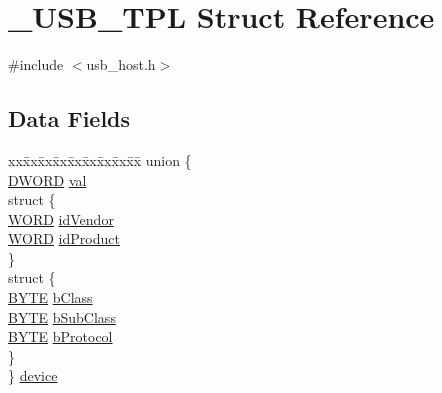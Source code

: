 \hypertarget{struct___u_s_b___t_p_l}{}\section{\+\_\+\+U\+S\+B\+\_\+\+T\+P\+L Struct Reference}
\label{struct___u_s_b___t_p_l}


{\ttfamily \#include $<$usb\+\_\+host.\+h$>$}

\subsection*{Data Fields}
\begin{DoxyCompactItemize}
\item 
\begin{tabbing}
xx\=xx\=xx\=xx\=xx\=xx\=xx\=xx\=xx\=\kill
union \{\\
\>\hyperlink{_generic_type_defs_8h_ad342ac907eb044443153a22f964bf0af}{DWORD} \hyperlink{struct___u_s_b___t_p_l_a5a7eddd9a55e78e10170062484c8c52a}{val}\\
\>struct \{\\
\>\>\hyperlink{_generic_type_defs_8h_a2b0e863dadf920709ec53d9088ee7c91}{WORD} \hyperlink{struct___u_s_b___t_p_l_aa6705f738420468e35fa0bcc980ef1d8}{idVendor}\\
\>\>\hyperlink{_generic_type_defs_8h_a2b0e863dadf920709ec53d9088ee7c91}{WORD} \hyperlink{struct___u_s_b___t_p_l_ac5fdd724b5bba710af6f437f19467636}{idProduct}\\
\>\} \\
\>struct \{\\
\>\>\hyperlink{_generic_type_defs_8h_a4ae1dab0fb4b072a66584546209e7d58}{BYTE} \hyperlink{struct___u_s_b___t_p_l_aad6f5bf23dbceea9fcd706a893c2e91e}{bClass}\\
\>\>\hyperlink{_generic_type_defs_8h_a4ae1dab0fb4b072a66584546209e7d58}{BYTE} \hyperlink{struct___u_s_b___t_p_l_a8bddf483b5f48cfd1b776cd5ecc12f7a}{bSubClass}\\
\>\>\hyperlink{_generic_type_defs_8h_a4ae1dab0fb4b072a66584546209e7d58}{BYTE} \hyperlink{struct___u_s_b___t_p_l_a00f6d86580d871426750e28e8c2e2fb7}{bProtocol}\\
\>\} \\
\} \hyperlink{struct___u_s_b___t_p_l_ab5c31c341c7d34ea28ff7d02020508d8}{device}\\


\end{tabbing}
\end{DoxyCompactItemize}
